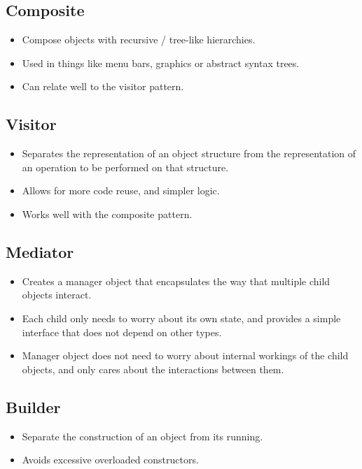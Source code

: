\documentclass[landscape]{cheat}
\begin{document}
\begin{multicols*}{3}
\subsection{Composite}
\begin{itemize}
    \item Compose objects with recursive / tree-like hierarchies.
    \item Used in things like menu bars, graphics or abstract syntax trees.
    \item Can relate well to the visitor pattern.
\end{itemize}

\subsection{Visitor}
\begin{itemize}
    \item Separates the representation of an object structure from the representation of an operation to be performed on that structure.
    \item Allows for more code reuse, and simpler logic.
    \item Works well with the composite pattern.
\end{itemize}

\subsection{Mediator}
\begin{itemize}
    \item Creates a manager object that encapsulates the way that multiple child objects interact.
    \item Each child only needs to worry about its own state, and provides a simple interface that does not depend on other types.
    \item Manager object does not need to worry about internal workings of the child objects, and only cares about the interactions between them.
\end{itemize}

\subsection{Builder}
\begin{itemize}
    \item Separate the construction of an object from its running.
    \item Avoids excessive overloaded constructors.
\end{itemize}


\end{multicols*}
\end{document}
